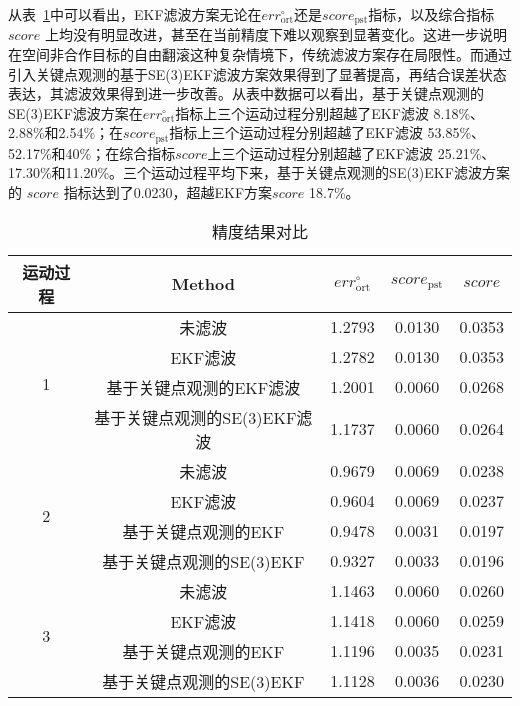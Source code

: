 从表~\ref{tab:caseekfcmp}中可以看出，EKF滤波方案无论在$err_{\text{ort}}^{\circ}$还是$score_{\text{pst}}$指标，以及综合指标 $score$ 上均没有明显改进，甚至在当前精度下难以观察到显著变化。这进一步说明在空间非合作目标的自由翻滚这种复杂情境下，传统滤波方案存在局限性。而通过引入关键点观测的基于SE(3)EKF滤波方案效果得到了显著提高，再结合误差状态表达，其滤波效果得到进一步改善。从表中数据可以看出，基于关键点观测的SE(3)EKF滤波方案在$err_{\text{ort}}^{\circ}$指标上三个运动过程分别超越了EKF滤波 8.18\%、2.88\%和2.54\%；在$score_{\text{pst}}$指标上三个运动过程分别超越了EKF滤波 53.85\%、52.17\%和40\%；在综合指标$score$上三个运动过程分别超越了EKF滤波 25.21\%、17.30\%和11.20\%。三个运动过程平均下来，基于关键点观测的SE(3)EKF滤波方案的 $score$ 指标达到了0.0230，超越EKF方案$score$ 18.7\%。

\begin{table}[htbp]
	\centering
	\caption{精度结果对比}
	\label{tab:caseekfcmp}
	{%
		\begin{tabular}{c c c c c}
			\toprule[1.5pt]
			运动过程 & Method 
			& $err_{\text{ort}}^{\circ}$ 
			& $score_{\text{pst}}$ 
			& $score$ \\
			\midrule[1pt]
			\multirow{4}{*}{1} 
			& 未滤波                       & 1.2793 & 0.0130 & 0.0353 \\
			& EKF滤波                       & 1.2782 & 0.0130 & 0.0353 \\
			& 基于关键点观测的EKF滤波            & 1.2001 & 0.0060 & 0.0268 \\
			& 基于关键点观测的SE(3)EKF滤波       & 1.1737 & 0.0060 & 0.0264 \\
			\midrule[1pt]
			\multirow{4}{*}{2}
			& 未滤波                       & 0.9679 & 0.0069 & 0.0238 \\
			& EKF滤波                       & 0.9604 & 0.0069 & 0.0237 \\
			& 基于关键点观测的EKF            & 0.9478 & 0.0031 & 0.0197 \\
			& 基于关键点观测的SE(3)EKF      & 0.9327 & 0.0033 & 0.0196 \\
			\midrule[1pt]
			\multirow{4}{*}{3}
			& 未滤波                       & 1.1463 & 0.0060 & 0.0260 \\
			& EKF滤波                       & 1.1418 & 0.0060 & 0.0259 \\
			& 基于关键点观测的EKF            & 1.1196 & 0.0035 & 0.0231 \\
			& 基于关键点观测的SE(3)EKF      & 1.1128 & 0.0036 & 0.0230 \\
			\bottomrule[1.5pt]
		\end{tabular}
	}
\end{table}

